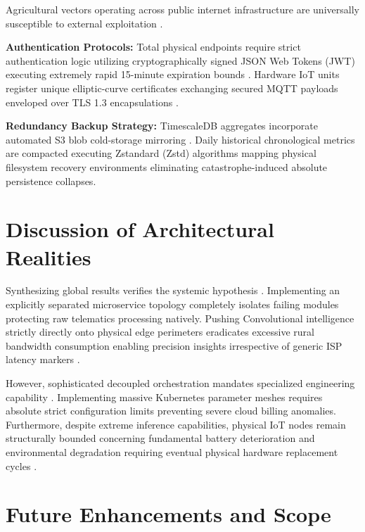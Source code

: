 \documentclass[12pt, a4paper]{report}
\begin{document}
Agricultural vectors operating across public internet infrastructure are universally susceptible to external exploitation \cite{r4}. 

\textbf{Authentication Protocols:} Total physical endpoints require strict authentication logic utilizing cryptographically signed JSON Web Tokens (JWT) executing extremely rapid 15-minute expiration bounds \cite{r5}. Hardware IoT units register unique elliptic-curve certificates exchanging secured MQTT payloads enveloped over TLS 1.3 encapsulations \cite{r6}.

\textbf{Redundancy Backup Strategy:} TimescaleDB aggregates incorporate automated S3 blob cold-storage mirroring \cite{r7}. Daily historical chronological metrics are compacted executing Zstandard (Zstd) algorithms mapping physical filesystem recovery environments eliminating catastrophe-induced absolute persistence collapses.

\chapter{Discussion of Architectural Realities}

Synthesizing global results verifies the systemic hypothesis \cite{r8}. Implementing an explicitly separated microservice topology completely isolates failing modules protecting raw telematics processing natively. Pushing Convolutional intelligence strictly directly onto physical edge perimeters eradicates excessive rural bandwidth consumption enabling precision insights irrespective of generic ISP latency markers \cite{r9}.

However, sophisticated decoupled orchestration mandates specialized engineering capability \cite{r10}. Implementing massive Kubernetes parameter meshes requires absolute strict configuration limits preventing severe cloud billing anomalies. Furthermore, despite extreme inference capabilities, physical IoT nodes remain structurally bounded concerning fundamental battery deterioration and environmental degradation requiring eventual physical hardware replacement cycles \cite{r11}.

\chapter{Future Enhancements and Scope}
\end{document}
